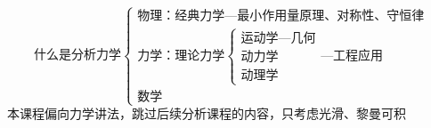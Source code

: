 \documentclass[12pt, a4paper, oneside, UTF8]{ctexbook}  %
\begin{document}
\else
\fi
\chapter{}
\begin{add}
\[
\text{什么是分析力学}\begin{cases}
    \text{物理：经典力学---最小作用量原理、对称性、守恒律}\\
    \text{力学：理论力学}\begin{cases}
        \text{运动学---几何}\\
        \text{动力学}\\
        \text{动理学}
    \end{cases}\text{---工程应用}\\
    \text{数学}
\end{cases}
\]
本课程偏向力学讲法，跳过后续分析课程的内容，只考虑光滑、黎曼可积
\end{add}
\end{document}
